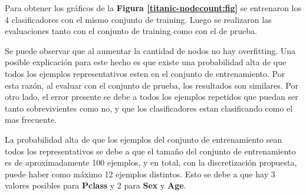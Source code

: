 \documentclass[a4paper]{article}
\newcommand{\reffig}[1]{\textbf{Figura \ref{#1}}}
\begin{document}
Para obtener los gráficos de la \reffig{titanic-nodecount:fig} se entrenaron los 4 clasificadores con el mismo conjunto de training. Luego se realizaron las evaluaciones tanto con el conjunto de training como con el de prueba.

Se puede observar que al aumentar la cantidad de nodos no hay overfitting. Una posible explicación para este hecho es que existe una probabilidad alta de que todos los ejemplos representativos esten en el conjunto de entrenamiento. Por esta razón, al evaluar con el conjunto de prueba, los resultados son similares. Por otro lado, el error presente se debe a todos los ejemplos repetidos que puedan ser tanto sobrevivientes como no, y que los clasificadores estan clasificando como el mas frecuente.

La probabilidad alta de que los ejemplos del conjunto de entrenamiento sean todos los representativos se debe a que el tamaño del conjunto de entrenamiento es de aproximadamente 100 ejemplos, y en total, con la discretización propuesta, puede haber como máximo 12 ejemplos distintos. Esto se debe a que hay 3 valores posibles para \textbf{Pclass} y 2 para \textbf{Sex} y \textbf{Age}.
\end{document}
